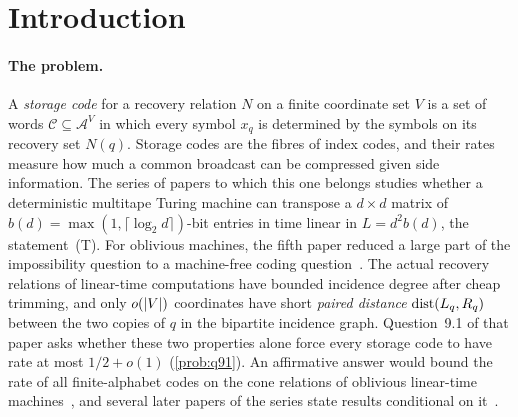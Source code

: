 \section{Introduction}\label{sec:intro}

\paragraph{The problem.} A \emph{storage code} for a recovery relation $N$ on a finite coordinate set $V$ is a set of
words $\mathcal C\subseteq\mathcal A^V$ in which every symbol $x_q$ is determined by the symbols on its recovery set
$N(q)$. Storage codes are the fibres of index codes, and their rates measure how much a common broadcast can be
compressed given side information. The series of papers to which this one belongs studies whether a deterministic
multitape Turing machine can transpose a $d\times d$ matrix of $b(d)=\max(1,\lceil\log_2d\rceil)$-bit entries in time
linear in $L=d^2b(d)$, the statement~(T). For oblivious machines, the fifth paper reduced a large part of the
impossibility question to a machine-free coding question~\cite{DirectedRecovery2026}. The actual recovery relations of
linear-time computations have bounded incidence degree after cheap trimming, and only $o(\lvert V \rvert)$ coordinates have short
\emph{paired distance} $\operatorname{dist}(L_q,R_q)$ between the two copies of $q$ in the bipartite incidence graph. Question~9.1 of
that paper asks whether these two properties alone force every storage code to have rate at most $1/2+o(1)$
(\cref{prob:q91}). An affirmative answer would bound the rate of all finite-alphabet codes on the cone relations of oblivious
linear-time machines~\cite[Proposition~9.2]{DirectedRecovery2026}, and several later papers of the series state results
conditional on it~\cite{BoundedNesting2026,DirectedReciprocity2026,MergeDepth2026}.


